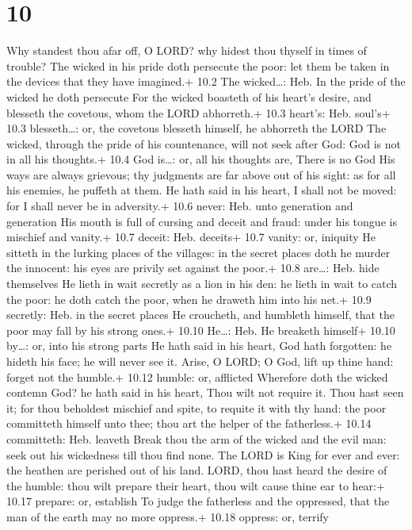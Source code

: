 \hypertarget{section-9}{%
\section{10}\label{section-9}}

 Why standest thou afar off, O LORD? why hidest thou thyself
in times of trouble?  The wicked in his pride doth persecute
the poor: let them be taken in the devices that they have imagined.+
10.2 The wicked\ldots: Heb. In the pride of the wicked he doth persecute
 For the wicked boasteth of his heart's desire, and blesseth
the covetous, whom the LORD abhorreth.+ 10.3 heart's: Heb. soul's+ 10.3
blesseth\ldots: or, the covetous blesseth himself, he abhorreth the LORD
 The wicked, through the pride of his countenance, will not
seek after God: God is not in all his thoughts.+ 10.4 God is\ldots: or,
all his thoughts are, There is no God  His ways are always
grievous; thy judgments are far above out of his sight: as for all his
enemies, he puffeth at them.  He hath said in his heart, I
shall not be moved: for I shall never be in adversity.+ 10.6 never: Heb.
unto generation and generation  His mouth is full of cursing
and deceit and fraud: under his tongue is mischief and vanity.+ 10.7
deceit: Heb. deceits+ 10.7 vanity: or, iniquity  He sitteth
in the lurking places of the villages: in the secret places doth he
murder the innocent: his eyes are privily set against the poor.+ 10.8
are\ldots: Heb. hide themselves  He lieth in wait secretly
as a lion in his den: he lieth in wait to catch the poor: he doth catch
the poor, when he draweth him into his net.+ 10.9 secretly: Heb. in the
secret places  He croucheth, and humbleth himself, that the
poor may fall by his strong ones.+ 10.10 He\ldots: Heb. He breaketh
himself+ 10.10 by\ldots: or, into his strong parts  He hath
said in his heart, God hath forgotten: he hideth his face; he will never
see it.  Arise, O LORD; O God, lift up thine hand: forget
not the humble.+ 10.12 humble: or, afflicted  Wherefore
doth the wicked contemn God? he hath said in his heart, Thou wilt not
require it.  Thou hast seen it; for thou beholdest mischief
and spite, to requite it with thy hand: the poor committeth himself unto
thee; thou art the helper of the fatherless.+ 10.14 committeth: Heb.
leaveth  Break thou the arm of the wicked and the evil man:
seek out his wickedness till thou find none.  The LORD is
King for ever and ever: the heathen are perished out of his land.
 LORD, thou hast heard the desire of the humble: thou wilt
prepare their heart, thou wilt cause thine ear to hear:+ 10.17 prepare:
or, establish  To judge the fatherless and the oppressed,
that the man of the earth may no more oppress.+ 10.18 oppress: or,
terrify

